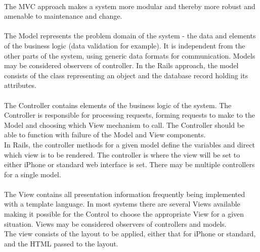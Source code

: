 \documentclass[letterpaper]{amsart}
\begin{document}
\paragraph{ }The MVC approach makes a system more modular and thereby more robust and amenable to maintenance and change.\cite{turborapid}
\\
\paragraph{ }The Model represents the problem domain of the system - the data and elements of the business logic (data validation for example)\cite{ibmsphere}. It is independent from the other parts of the system, using generic data formats for communication. Models may be considered observers of controller.  In the Rails approach, the model consists of the class representing an object and the database record holding its attributes. 
\paragraph{ }The Controller contains elements of the business logic of the system. The Controller is responsible for processing requests, forming requests to make to the Model and choosing which View mechanism to call. The Controller should be able to function with failure of the Model and View components\cite{ibmsphere}.\\ In Rails, the controller methods for a given model define the variables and direct which view is to be rendered.  The controller is where the view will be set to either iPhone or standard web interface is set. There may be multiple controllers for a single model.\\ 
\paragraph{ }The View contains all presentation information frequently being implemented with a template language. In most systems there are several Views available making it possible for the Control to choose the appropriate View for a given situation. Views may be considered observers of controllers and models.\\The view consists of the layout to be applied, either that for iPhone or standard, and the HTML passed to the layout.
\end{document}
